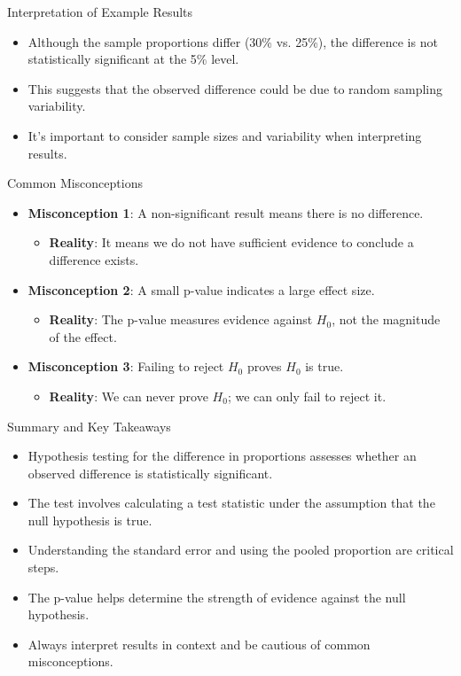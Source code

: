 \documentclass[handout]{beamer} %
\begin{document}
\begin{frame}{Interpretation of Example Results}
  \begin{itemize}
    \item Although the sample proportions differ (30\% vs. 25\%), the difference is not statistically significant at the 5\% level.
    \item This suggests that the observed difference could be due to random sampling variability.
    \item It's important to consider sample sizes and variability when interpreting results.
  \end{itemize}
\end{frame}

\begin{frame}{Common Misconceptions}
  \begin{itemize}
    \item \textbf{Misconception 1}: A non-significant result means there is no difference.
      \begin{itemize}
        \item \textbf{Reality}: It means we do not have sufficient evidence to conclude a difference exists.
      \end{itemize}
    \item \textbf{Misconception 2}: A small p-value indicates a large effect size.
      \begin{itemize}
        \item \textbf{Reality}: The p-value measures evidence against $H_0$, not the magnitude of the effect.
      \end{itemize}
    \item \textbf{Misconception 3}: Failing to reject $H_0$ proves $H_0$ is true.
      \begin{itemize}
        \item \textbf{Reality}: We can never prove $H_0$; we can only fail to reject it.
      \end{itemize}
  \end{itemize}
\end{frame}

\begin{frame}{Summary and Key Takeaways}
  \begin{itemize}
    \item Hypothesis testing for the difference in proportions assesses whether an observed difference is statistically significant.
    \item The test involves calculating a test statistic under the assumption that the null hypothesis is true.
    \item Understanding the standard error and using the pooled proportion are critical steps.
    \item The p-value helps determine the strength of evidence against the null hypothesis.
    \item Always interpret results in context and be cautious of common misconceptions.
  \end{itemize}
\end{frame}
\end{document}
